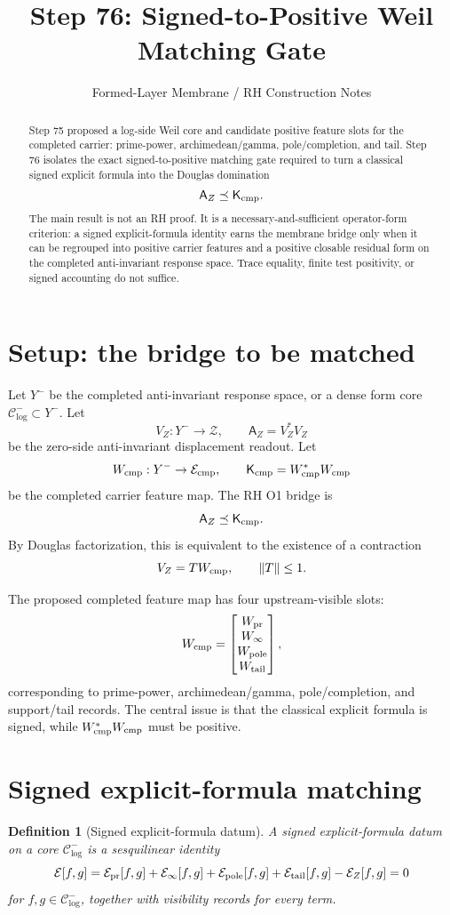 \documentclass[11pt]{article}
\title{Step 76: Signed-to-Positive Weil Matching Gate}
\author{Formed-Layer Membrane / RH Construction Notes}
\date{}
\newtheorem{definition}{Definition}
\newcommand{\AZ}{\mathsf A_Z}
\newcommand{\Kcmp}{\mathsf K_{\rm cmp}}
\newcommand{\Ccore}{\mathcal C^-_{\log}}
\newcommand{\VEF}{\mathcal E}
\begin{document}
\maketitle

\begin{abstract}
Step 75 proposed a log-side Weil core and candidate positive feature slots for the completed carrier: prime-power, archimedean/gamma, pole/completion, and tail. Step 76 isolates the exact signed-to-positive matching gate required to turn a classical signed explicit formula into the Douglas domination
\[
  \AZ\preceq\Kcmp.
\]
The main result is not an RH proof. It is a necessary-and-sufficient operator-form criterion: a signed explicit-formula identity earns the membrane bridge only when it can be regrouped into positive carrier features and a positive closable residual form on the completed anti-invariant response space. Trace equality, finite test positivity, or signed accounting do not suffice.
\end{abstract}

\section{Setup: the bridge to be matched}
Let $Y^-$ be the completed anti-invariant response space, or a dense form core $\Ccore\subset Y^-$. Let
\[
  V_Z:Y^-\to\mathcal Z,
  \qquad
  \AZ=V_Z^*V_Z
\]
be the zero-side anti-invariant displacement readout. Let
\[
  W_{\rm cmp}:Y^-\to\mathcal E_{\rm cmp},
  \qquad
  \Kcmp=W_{\rm cmp}^*W_{\rm cmp}
\]
be the completed carrier feature map. The RH O1 bridge is
\[
  \AZ\preceq\Kcmp.
\]
By Douglas factorization, this is equivalent to the existence of a contraction
\[
  V_Z=T W_{\rm cmp},\qquad \|T\|\le1.
\]

The proposed completed feature map has four upstream-visible slots:
\[
  W_{\rm cmp}=\begin{bmatrix}
  W_{\rm pr}\\ W_\infty\\ W_{\rm pole}\\ W_{\rm tail}
  \end{bmatrix},
\]
corresponding to prime-power, archimedean/gamma, pole/completion, and support/tail records. The central issue is that the classical explicit formula is signed, while $W_{\rm cmp}^*W_{\rm cmp}$ must be positive.

\section{Signed explicit-formula matching}
\begin{definition}[Signed explicit-formula datum]
A signed explicit-formula datum on a core $\Ccore$ is a sesquilinear identity
\[
  \VEF[f,g]=\VEF_{\rm pr}[f,g]+\VEF_\infty[f,g]+\VEF_{\rm pole}[f,g]+\VEF_{\rm tail}[f,g]-\VEF_Z[f,g]=0
\]
for $f,g\in\Ccore$, together with visibility records for every term.
\end{definition}
\end{document}
